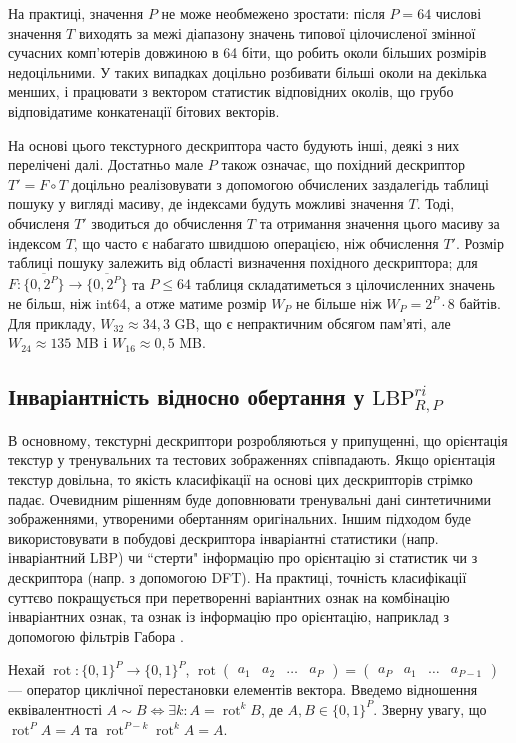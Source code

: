 На практиці, значення $P$ не може необмежено зростати: після $P=64$ числові значення $T$ виходять за межі діапазону значень типової цілочисленої змінної сучасних комп'ютерів довжиною в 64 біти, 
що робить околи більших розмірів недоцільними. У таких випадках доцільно розбивати більші околи на декілька менших, і працювати з вектором статистик відповідних околів,
що грубо відповідатиме конкатенації бітових векторів. 

На основі цього текстурного дескриптора часто будують інші, деякі з них перелічені далі.
Достатньо мале $P$ також означає, що похідний дескриптор $T' = F \circ T$ доцільно реалізовувати з допомогою обчислених заздалегідь таблиці пошуку у вигляді масиву, 
де індексами будуть можливі значення $T$.
Тоді, обчисленя $T'$ зводиться до обчислення $T$ та отримання значення цього масиву за індексом $T$, що часто є набагато швидшою операцією, ніж обчислення $T'$.
Розмір таблиці пошуку залежить від області визначення похідного дескриптора; 
для $F \colon \{\overline{0,2^P}\} \to \{\overline{0,2^P}\}$ та $P\le 64$ таблиця складатиметься з цілочисленних значень не більш, ніж int64, 
а отже матиме розмір $W_P$ не більше ніж $W_P = 2^P \cdot 8$ байтів. 
Для прикладу, $W_{32} \approx 34{,}3$ GB, що є непрактичним обсягом пам'яті, але $W_{24} \approx 135$ MB і $W_{16} \approx 0{,}5$ MB.

\subsection{Інваріантність відносно обертання у \(\mathrm{LBP}_{R,P}^{ri}\)}\label{section1.1c}\hfill

В основному, текстурні дескриптори розробляються у припущенні, що орієнтація текстур у тренувальних та тестових зображеннях співпадають.
Якщо орієнтація текстур довільна, то якість класифікації на основі цих дескрипторів стрімко падає. 
Очевидним рішенням буде доповнювати тренувальні дані синтетичними зображеннями, утвореними обертанням оригінальних. 
Іншим підходом буде використовувати в побудові дескриптора інваріантні статистики (напр. інваріантний LBP) чи 
``стерти" інформацію про орієнтацію зі статистик чи з дескриптора (напр. з допомогою DFT). 
На практиці, точність класифікації суттєво покращується при перетворенні варіантних ознак на комбінацію інваріантних ознак, та ознак із інформацію про орієнтацію, наприклад з допомогою фільтрів Габора \cite{guo2010lbpv}. 

Нехай $\operatorname{rot} : \{0,1\}^P \to \{0,1\}^P$, 
$\operatorname{rot} \begin{pmatrix}a_1 & a_2 & \dots  & a_P\end{pmatrix} = \begin{pmatrix}a_P & a_1 & \dots  & a_{P-1}\end{pmatrix}$ 
--- оператор циклічної перестановки елементів вектора.
Введемо відношення еквівалентності $A\sim B \iff \exists k: A = \operatorname{rot}^k B$, де $A,B \in \{0,1\}^P$.
Зверну увагу, що $\operatorname{rot}^P A = A$ та $\operatorname{rot}^{P-k} \operatorname{rot}^k A = A$.

